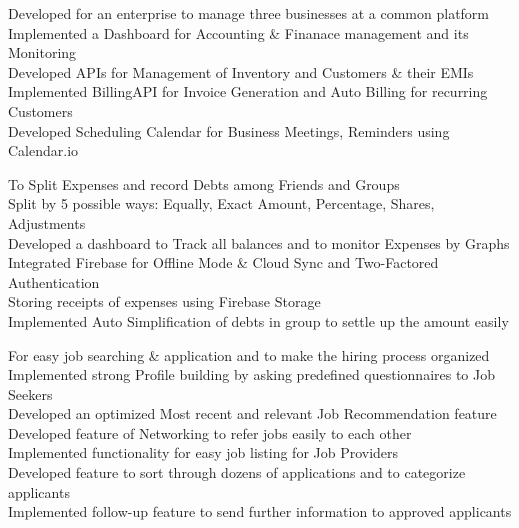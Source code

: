 \documentclass[]{jaydeep-resume-openfont}
\begin{document}
\begin{minipage}[t]{0.70\textwidth}
\textbullet{} Developed for an enterprise to manage three businesses at a common platform \\
\textbullet{} Implemented a Dashboard for Accounting \& Finanace management and its Monitoring \\
\textbullet{} Developed APIs for Management of Inventory and Customers \& their EMIs  \\
\textbullet{} Implemented BillingAPI for Invoice Generation and Auto Billing for recurring Customers  \\
\textbullet{} Developed Scheduling Calendar for Business Meetings, Reminders using Calendar.io \\
\sectionsep

\textbullet{} To Split Expenses and record Debts among Friends and Groups\\
\textbullet{} Split by 5 possible ways: Equally, Exact Amount, Percentage, Shares, Adjustments \\
\textbullet{} Developed a dashboard to Track all balances  and to monitor Expenses by Graphs\\
\textbullet{} Integrated Firebase for Offline Mode \& Cloud Sync and Two-Factored Authentication\\
\textbullet{} Storing receipts of expenses using Firebase Storage\\
\textbullet{} Implemented Auto Simplification of debts in group to settle up the amount easily \\
\sectionsep

\textbullet{} For easy job searching \& application and to make the hiring process organized\\
\textbullet{} Implemented strong Profile building by asking predefined questionnaires to Job Seekers\\
\textbullet{} Developed an optimized Most recent and relevant Job Recommendation feature\\
\textbullet{} Developed feature of Networking to refer jobs easily to each other\\
\textbullet{} Implemented functionality for easy job listing for Job Providers\\
\textbullet{} Developed feature to sort through dozens of applications and to categorize applicants\\
\textbullet{} Implemented follow-up feature to send further information to approved applicants\\
\sectionsep


\end{minipage}
\end{document}
